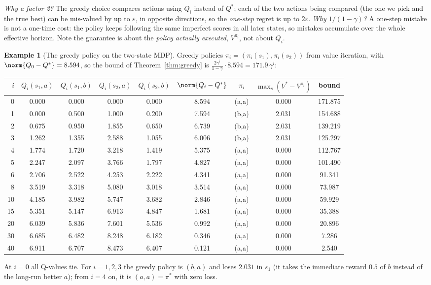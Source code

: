 \documentclass[11pt,a4paper]{article}
\theoremstyle{plain}
\theoremstyle{definition}
\newtheorem{example}[theorem]{Example}
\theoremstyle{remark}
\begin{document}
\begin{intuition}
\emph{Why a factor 2?} The greedy choice compares actions using $Q_i$ instead of $Q^*$; each of the two actions being compared (the one we pick and the true best) can be mis-valued by up to $\varepsilon$, in opposite directions, so the \emph{one-step} regret is up to $2\varepsilon$. \emph{Why $1/(1-\gamma)$?} A one-step mistake is not a one-time cost: the policy keeps following the same imperfect scores in all later states, so mistakes accumulate over the whole effective horizon. Note the guarantee is about the \emph{policy actually executed}, $V^{\pi_i}$, not about $Q_i$.
\end{intuition}

\begin{example}[The greedy policy on the two-state MDP]\label{ex:greedy}
Greedy policies $\pi_i=(\pi_i(s_1),\pi_i(s_2))$ from value iteration, with $\norm{Q_0-Q^*}=8.594$, so the bound of Theorem~\ref{thm:greedy} is $\tfrac{2\gamma^i}{1-\gamma}\cdot8.594=171.9\,\gamma^i$:
\begin{center}
\small
\begin{tabular}{@{}rcccccccc@{}}
\toprule
$i$ & $Q_i(s_1,a)$ & $Q_i(s_1,b)$ & $Q_i(s_2,a)$ & $Q_i(s_2,b)$ & $\norm{Q_i-Q^*}$ & $\pi_i$ & $\max_s(V^*-V^{\pi_i})$ & bound\\
\midrule
0 & 0.000 & 0.000 & 0.000 & 0.000 & 8.594 & (a,a) & 0.000 & 171.875 \\
1 & 0.000 & 0.500 & 1.000 & 0.200 & 7.594 & (b,a) & 2.031 & 154.688 \\
2 & 0.675 & 0.950 & 1.855 & 0.650 & 6.739 & (b,a) & 2.031 & 139.219 \\
3 & 1.262 & 1.355 & 2.588 & 1.055 & 6.006 & (b,a) & 2.031 & 125.297 \\
4 & 1.774 & 1.720 & 3.218 & 1.419 & 5.375 & (a,a) & 0.000 & 112.767 \\
5 & 2.247 & 2.097 & 3.766 & 1.797 & 4.827 & (a,a) & 0.000 & 101.490 \\
6 & 2.706 & 2.522 & 4.253 & 2.222 & 4.341 & (a,a) & 0.000 & 91.341 \\
8 & 3.519 & 3.318 & 5.080 & 3.018 & 3.514 & (a,a) & 0.000 & 73.987 \\
10 & 4.185 & 3.982 & 5.747 & 3.682 & 2.846 & (a,a) & 0.000 & 59.929 \\
15 & 5.351 & 5.147 & 6.913 & 4.847 & 1.681 & (a,a) & 0.000 & 35.388 \\
20 & 6.039 & 5.836 & 7.601 & 5.536 & 0.992 & (a,a) & 0.000 & 20.896 \\
30 & 6.685 & 6.482 & 8.248 & 6.182 & 0.346 & (a,a) & 0.000 & 7.286 \\
40 & 6.911 & 6.707 & 8.473 & 6.407 & 0.121 & (a,a) & 0.000 & 2.540 \\
\bottomrule
\end{tabular}
\end{center}
At $i=0$ all Q-values tie. For $i=1,2,3$ the greedy policy is $(b,a)$ and loses $2.031$ in $s_1$ (it takes the immediate reward $0.5$ of $b$ instead of the long-run better $a$); from $i=4$ on, it is $(a,a)=\pi^*$ with zero loss.
\end{example}
\end{document}
